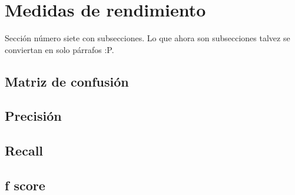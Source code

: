 \section{Medidas de rendimiento}

Sección número siete con subsecciones.
Lo que ahora son subsecciones talvez se conviertan en solo párrafos :P.

\subsection{Matriz de confusión}
\subsection{Precisión}
\subsection{Recall}
\subsection{f score}

